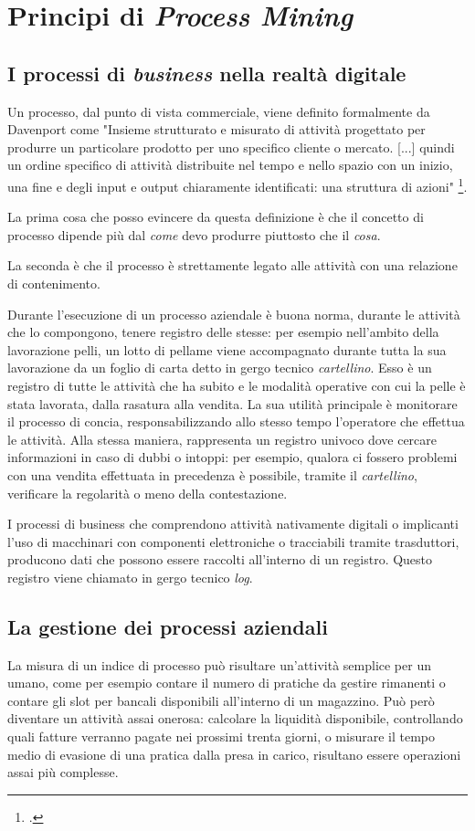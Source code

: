 \section{Principi di \textit{Process Mining}}
\subsection{I processi di \textit{business} nella realtà digitale}
Un processo, dal punto di vista commerciale, viene definito formalmente da Davenport come "Insieme strutturato e misurato di attività progettato per produrre un particolare prodotto per uno specifico cliente o mercato. [...] quindi un ordine specifico di attività distribuite nel tempo e nello spazio con un inizio, una fine e degli input e output chiaramente identificati: una struttura di azioni" \footcite{davenport:ProcessInnovation}.

La prima cosa che posso evincere da questa definizione è che il concetto di processo dipende più dal \emph{come} devo produrre piuttosto che il \emph{cosa}.

La seconda è che il processo è strettamente legato alle attività con una relazione di contenimento.

Durante l'esecuzione di un processo aziendale è buona norma, durante le attività che lo compongono, tenere registro delle stesse: per esempio nell'ambito della lavorazione pelli, un lotto di pellame viene accompagnato durante tutta la sua lavorazione da un foglio di carta detto in gergo tecnico \emph{cartellino}. Esso è un registro di tutte le attività che ha subito e le modalità operative con cui la pelle è stata lavorata, dalla rasatura alla vendita. La sua utilità principale è monitorare il processo di concia, responsabilizzando allo stesso tempo l'operatore che effettua le attività. Alla stessa maniera, rappresenta un registro univoco dove cercare informazioni in caso di dubbi o intoppi: per esempio, qualora ci fossero problemi con una vendita effettuata in precedenza è possibile, tramite il \emph{cartellino}, verificare la regolarità o meno della contestazione.

I processi di business che comprendono attività nativamente digitali o implicanti l'uso di macchinari con componenti elettroniche o tracciabili tramite trasduttori, producono dati che possono essere raccolti all'interno di un registro. Questo registro viene chiamato in gergo tecnico \textit{log}.


\subsection{La gestione dei processi aziendali}
La misura di un indice di processo può risultare un'attività semplice per un umano, come per esempio contare il numero di pratiche da gestire rimanenti o contare gli slot per bancali disponibili all'interno di un magazzino. Può però diventare un attività assai onerosa: calcolare la liquidità disponibile, controllando quali fatture verranno pagate nei prossimi trenta giorni, o misurare il tempo medio di evasione di una pratica dalla presa in carico, risultano essere operazioni assai più complesse.

